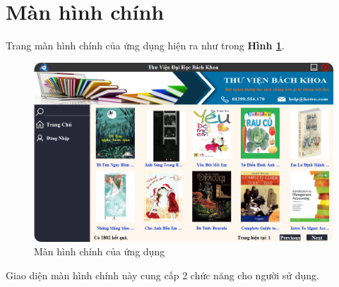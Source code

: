 \documentclass[12pt]{report}
\begin{document}
				\section{Màn hình chính} 
					Trang màn hình chính của ứng dụng hiện ra như trong \textbf{Hình \ref{fig:mainscreen}}.\\
					\begin{figure}
						\centering
						\includegraphics[scale=0.65]{images/mainscreen.png}
						\caption{Màn hình chính của ứng dụng}
						\label{fig:mainscreen}
					\end{figure}
					Giao diện màn hình chính này cung cấp 2 chức năng cho người sử dụng.
\end{document}
